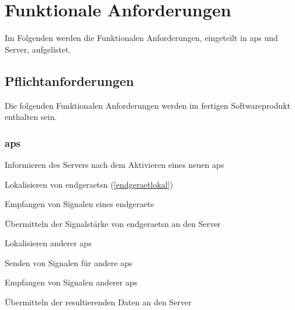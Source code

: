 \section{Funktionale Anforderungen}
Im Folgenden werden die Funktionalen Anforderungen, eingeteilt in \glspl{ap} und Server, aufgelistet.
\subsection{Pflichtanforderungen}
Die folgenden Funktionalen Anforderungen werden im fertigen Softwareprodukt enthalten sein.

\subsubsection{\glspl{ap}}
\begin{apfalist}
	\item \label{faserverinformieren} Informieren des Servers nach dem Aktivieren eines neuen \gls{ap}s
	\item \label{faendgeraetelokaliseren} Lokalisieren von \glspl{endgeraet}n (\ref{endgeraetlokal})
	\begin{apfalist}
		\item \label{faendgeraetsignalempfangen} Empfangen von Signalen eines \gls{endgeraet}s
		\item \label{faendgeraetdatenuebermitteln} Übermitteln der Signalstärke von \glspl{endgeraet}n an den Server
	\end{apfalist}
	\item \label{faapslokalisieren} Lokalisieren anderer \glspl{ap}
	\begin{apfalist}
		\item \label{fasignalsenden} Senden von Signalen für andere \glspl{ap}
		\item \label{faapsignalempfangen}Empfangen von Signalen anderer \glspl{ap}
		\item \label{faapdatenuebermitteln} Übermitteln der resultierenden Daten an den Server
	\end{apfalist}
\end{apfalist}
